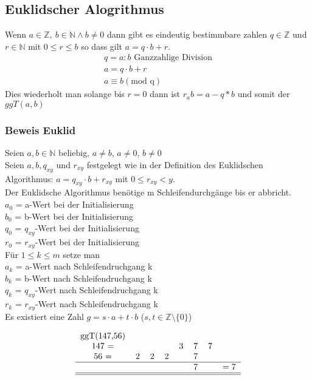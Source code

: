 \documentclass[a4paper]{scrartcl}
\begin{document}
\subsection{Euklidscher Alogrithmus}
Wenn $a \in \mathbb{Z}, \ b \in \mathbb{N} \wedge b \neq 0$ dann gibt es eindeutig bestimmbare zahlen $q \in \mathbb{Z} $ und $r \in \mathbb{N}$ mit $0 \leq r \leq b $ so dass gilt $a = q \cdot b + r$. \\
\begin{align}
q=a : b \text{ Ganzzahlige Division}\\
a = q \cdot b + r \\
a \equiv b (\text{mod q})
\end{align}
Dies wiederholt man solange bis $r=0$ dann ist $r_ab = a - q * b$ und somit der $ggT(a,b)$\\
\subsubsection{Beweis Euklid}
Seien $a, b \in \mathbb{N}$ beliebig, $a \neq b$, $a \neq 0$, $b \neq 0$ \\
Seien $a, b, q_{xy}$ und $r_{xy}$ festgelegt wie in der Definition des Euklidschen Algorithmus: $a=q_{xy} \cdot b + r_{xy}$ mit $0 \leq r_{xy} < y$. \\
Der Euklidsche Algorithmus benötige m Schleifendurchgänge bis er abbricht. \\
$a_0$ = a-Wert bei der Initialisierung \\
$b_0$ = b-Wert bei der Initialisierung \\
$q_0$ = $q_{xy}$-Wert bei der Initialisierung \\
$r_0$ = $r_{xy}$-Wert bei der Initialisierung \\
\newline
Für $1 \leq k \leq m$ setze man \\
$a_k$ = a-Wert nach Schleifendruchgang k\\
$b_k$ = b-Wert nach Schleifendruchgang k\\
$q_k$ = $q_{xy}$-Wert nach Schleifendruchgang k\\
$r_k$ = $r_{xy}$-Wert nach Schleifendruchgang k\\
\newline
Es existiert eine Zahl $g=s \cdot a + t \cdot b$ ($s,t \in \mathbb{Z} \setminus \{0\}$)

\begin{align}
\begin{tabular}{c c c c c c c c }
ggT(147,56) \\
147 =&&& &3&7&7 \\
56 =&2&2&2&&7 \\
\hline 
&&&&&7&&$=7$ \\
\hline \hline
\end{tabular}
\end{align}
\end{document}
